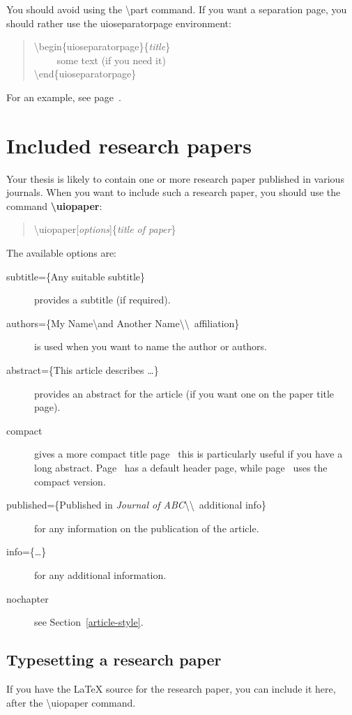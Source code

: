 \documentclass[UKenglish, thumbmarks]{uiophdthesis}
\newcommand{\bsl}{\textbackslash}
\newcommand{\dash}{\textthreequartersemdash}
\newcommand{\p}[1]{\textsf{#1}}
\newcommand{\pcmd}[1]{\p{\bsl #1}}
\newcommand{\popt}[1]{\p{[#1]}}
\newcommand{\ppar}[1]{\p{\{#1\}}}
\begin{document}
You should avoid using the \pcmd{part} command. If you want a
separation page, you should rather use the \p{uioseparatorpage}
environment:

\begin{quote}
  \pcmd{begin}\ppar{uioseparatorpage}\ppar{\emph{title}}\\
  ~~~~ some text (if you need it)\\
  \pcmd{end}\ppar{uioseparatorpage}
\end{quote}
For an example, see page~\pageref{intro-part}.

\section{Included research papers\label{uiopaper}}
Your thesis is likely to contain one or more research paper published
in various journals. When you want to include such a research
paper, you should use the command \textbf{\pcmd{uiopaper}}:
\begin{quote}
  \pcmd{uiopaper}\popt{\emph{options}}\ppar{\emph{title of paper}}
\end{quote}
The available options are:
\begin{description}
\item[\p{subtitle=\ppar{Any suitable subtitle}}] provides a subtitle
  (if required).
\item[\p{authors=\ppar{My Name\pcmd{and} Another Name\bsl\bsl\ affiliation}}] is
  used when you want to name the author or authors.
\item[\p{abstract=\ppar{This article describes \dots}}] provides
  an abstract for the article (if you want one on the paper title
  page).
\item[\p{compact}] gives a more compact title page~\dash{}
  this is particularly useful if you have a long
  abstract. Page~\pageref{info-part} has a default header page, while
  page~\pageref{part:example} uses the compact version.
\item[\p{published=\ppar{Published in \emph{Journal of ABC}\bsl\bsl\ 
      additional info}}] for any information on the publication of the
  article. 
\item[\p{info=\ppar{\dots}}] for any additional information.
\item[\p{nochapter}] see Section~\vref{article-style}.
\end{description}

\subsection{Typesetting a research paper}
If you have the \LaTeX{} source for the research paper, you can include it
here, after the \pcmd{uiopaper} command.
\end{document}

